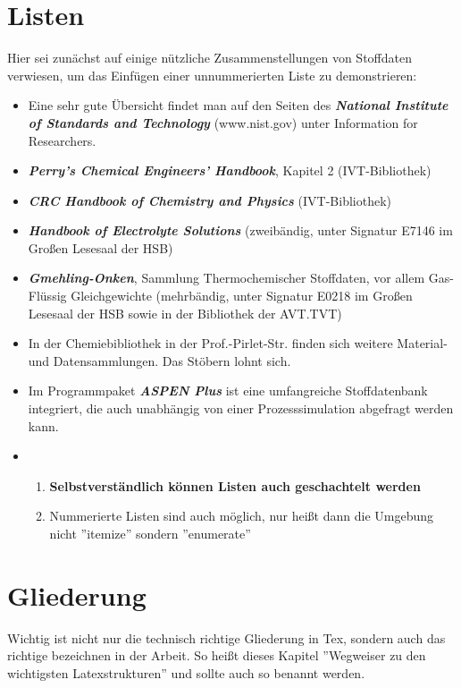 \section {Listen}
Hier sei zunächst auf einige nützliche Zusammenstellungen von
Stoffdaten verwiesen, um das Einfügen einer unnummerierten Liste
zu demonstrieren:
\begin{itemize}
    \item Eine sehr gute Übersicht findet man auf den Seiten des \emph{\textbf{National Institute of Standards and Technology}} (www.nist.gov) unter Information for Researchers.
    \item \emph{\textbf{Perry's Chemical Engineers' Handbook}}, Kapitel 2 (IVT-Bibliothek)
    \item \emph{\textbf{CRC Handbook of Chemistry and Physics}} (IVT-Bibliothek)
    \item \emph{\textbf{Handbook of Electrolyte Solutions}} (zweibändig, unter Signatur E7146 im Großen Lesesaal der HSB)
    \item \emph{\textbf{Gmehling-Onken}}, Sammlung Thermochemischer Stoffdaten, vor allem Gas-Flüssig Gleichgewichte (mehrbändig, unter Signatur E0218 im Großen Lesesaal der HSB sowie in der Bibliothek der AVT.TVT)
    \item In der Chemiebibliothek in der Prof.-Pirlet-Str. finden sich weitere Material- und Datensammlungen. Das Stöbern lohnt sich.
    \item Im Programmpaket \emph{\textbf{ASPEN Plus}} ist eine umfangreiche Stoffdatenbank integriert, die auch unabhängig von einer Prozesssimulation abgefragt werden kann.
    \item   \begin{enumerate}
        \item \textbf{Selbstverständlich können Listen auch geschachtelt
        werden}
        \item Nummerierte Listen sind auch möglich, nur heißt dann die Umgebung nicht ''itemize'' sondern ''enumerate''
            \end{enumerate}

\end{itemize}

		\section {Gliederung}
			Wichtig ist nicht nur die technisch richtige Gliederung in Tex,
			sondern auch das richtige bezeichnen in der Arbeit. So heißt
			dieses Kapitel ''Wegweiser zu den wichtigsten Latexstrukturen''
			und sollte auch so benannt werden.
			
